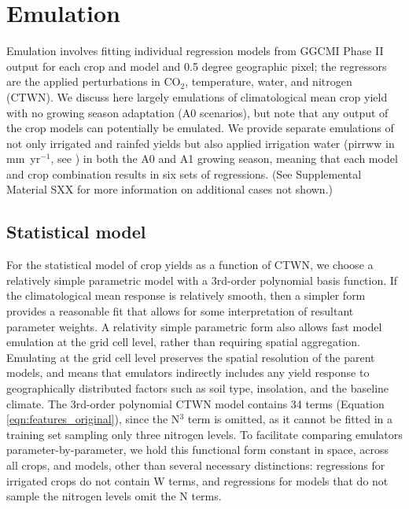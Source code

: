 \documentclass[gmd, manuscript]{copernicus} %
\begin{document}
\section{Emulation}
\label{S:3}
Emulation involves fitting individual regression models from GGCMI Phase II output for each crop and model and 0.5 degree geographic pixel; the regressors are the applied perturbations in CO$_2$, temperature, water, and nitrogen (CTWN). 
We discuss here largely emulations of climatological mean crop yield with no growing season adaptation (A0 scenarios), but note that any output of the crop models can potentially be emulated. 
We provide separate emulations of not only irrigated and rainfed yields but also applied irrigation water (pirrww in mm\ yr$^{-1}$, see \citep{Franke2019a}) in both the A0 and A1 growing season, meaning that each model and crop combination results in six sets of regressions. (See Supplemental Material SXX for more information on additional cases not shown.)

\subsection{Statistical model}
For the statistical model of crop yields as a function of CTWN, we choose a relatively simple parametric model with a 3rd-order polynomial basis function. 
If the climatological mean response is relatively smooth, then a simpler form provides a reasonable fit that allows for some interpretation of resultant parameter weights. 
A relativity simple parametric form also allows fast model emulation at the grid cell level, rather than requiring spatial aggregation. 
Emulating at the grid cell level preserves the spatial resolution of the parent models, and means that emulators indirectly includes any yield response to geographically distributed factors such as soil type, insolation, and the baseline climate.
The 3rd-order polynomial CTWN model contains 34 terms (Equation \ref{eqn:features_original}), since the N$^3$ term is omitted, as it cannot be fitted in a training set sampling only three nitrogen levels.  To facilitate comparing emulators parameter-by-parameter, we hold this functional form constant in space, across all crops, and models, other than several necessary distinctions: 
regressions for irrigated crops do not contain W terms, and regressions for models that do not sample the nitrogen levels omit the N terms. 
\end{document}
